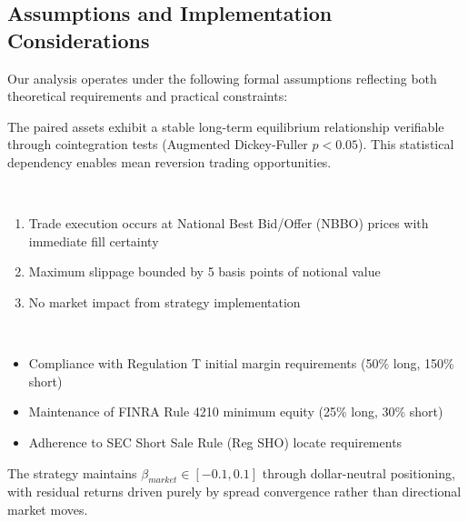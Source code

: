 \subsection{Assumptions and Implementation Considerations}
Our analysis operates under the following formal assumptions reflecting both theoretical requirements and practical constraints:

\begin{assumption} \label{assum:coint}
The paired assets exhibit a stable long-term equilibrium relationship verifiable through cointegration tests (Augmented Dickey-Fuller $p < 0.05$). This statistical dependency enables mean reversion trading opportunities. 
\end{assumption}

\begin{assumption} \label{assum:execution} \
\begin{enumerate}
    \item Trade execution occurs at National Best Bid/Offer (NBBO) prices with immediate fill certainty
    \item Maximum slippage bounded by 5 basis points of notional value
    \item No market impact from strategy implementation
\end{enumerate}

\end{assumption}

\begin{assumption} \label{assum:regulation} \
\begin{itemize}
    \item Compliance with Regulation T initial margin requirements (50\% long, 150\% short)
    \item Maintenance of FINRA Rule 4210 minimum equity (25\% long, 30\% short)
    \item Adherence to SEC Short Sale Rule (Reg SHO) locate requirements
\end{itemize}
\end{assumption}

\begin{assumption} \label{assum:neutrality}
The strategy maintains $\beta_{market} \in [-0.1, 0.1]$ through dollar-neutral positioning, with residual returns driven purely by spread convergence rather than directional market moves.
\end{assumption}

